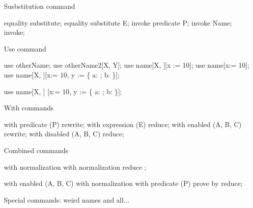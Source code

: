 Susbstitution command

\begin{zproof}[substCmd]
equality substitute;
equality substitute E;
invoke predicate P;
invoke Name;
invoke;
\end{zproof}

Use command

\begin{zproof}[useCmd]
use otherName;
use otherName2[X, Y];
use name[X, \power \nat][x := 10];
use name[x:= 10];
use name[X, \power \nat][x:= 10,
  y := \{ a: \nat; b: \nat \}];

use name[X, \power \nat]
[x:= 10,
  y := \{ a: \nat; b: \nat \}];
\end{zproof}

With commands

\begin{zproof}[withCmds]
with predicate (P) rewrite;
with expression (E) reduce;
with enabled (A, B, C) rewrite;
with disabled (A, B, C) reduce;
\end{zproof}

Combined commands

\begin{zproof}[combinedCmd1]
with normalization
      with
          normalization
              reduce
      ;           %

with enabled (A, B, C)
  with normalization
    with predicate (P)
      prove by reduce;
\end{zproof}


Special commands: weird names and all...


